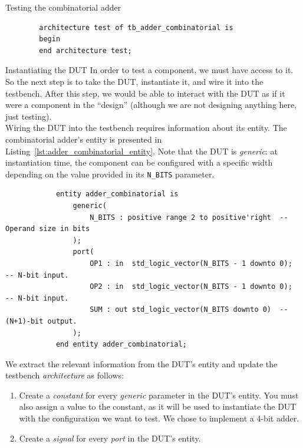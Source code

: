 \documentclass[a4paper, 12pt, onecolumn]{article}
\begin{document}
\begin{section}{Testing the combinatorial adder}
\begin{verbatim}
        architecture test of tb_adder_combinatorial is
        begin
        end architecture test;
    \end{verbatim}
    \vspace{-1em}

    \clearpage

    \begin{subsection}{Instantiating the DUT}
        In order to test a component, we must have access to it. So the next step is to take the DUT, instantiate it, and wire it into the testbench. After this step, we would be able to interact with the DUT as if it were a component in the ``design'' (although we are not designing anything here, just testing). \\

        Wiring the DUT into the testbench requires information about its entity. The combinatorial adder's entity is presented in Listing~\ref{lst:adder_combinatorial_entity}. Note that the DUT is \emph{generic}: at instantiation time, the component can be configured with a specific width depending on the value provided in its \texttt{N\_BITS} parameter.

        \begin{verbatim}
            entity adder_combinatorial is
                generic(
                    N_BITS : positive range 2 to positive'right  -- Operand size in bits
                );
                port(
                    OP1 : in  std_logic_vector(N_BITS - 1 downto 0);  -- N-bit input.
                    OP2 : in  std_logic_vector(N_BITS - 1 downto 0);  -- N-bit input.
                    SUM : out std_logic_vector(N_BITS downto 0)  -- (N+1)-bit output.
                );
            end entity adder_combinatorial;
        \end{verbatim}
        \vspace{-1em}

        We extract the relevant information from the DUT's entity and update the testbench \emph{architecture} as follows:

        \begin{enumerate}
            \item Create a \emph{constant} for every \emph{generic} parameter in the DUT's entity. You must also assign a value to the constant, as it will be used to instantiate the DUT with the configuration we want to test. We chose to implement a 4-bit adder.
            \item Create a \emph{signal} for every \emph{port} in the DUT's entity.
        \end{enumerate}


\end{subsection}
\end{section}
\end{document}
